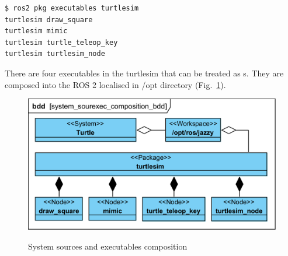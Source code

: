 \documentclass[11pt,oneside,a4paper]{report}
\begin{document}
\begin{lstlisting}[style=terminal]
$ ros2 pkg executables turtlesim
turtlesim draw_square
turtlesim mimic
turtlesim turtle_teleop_key
turtlesim turtlesim_node
\end{lstlisting}

There are four executables in the turtlesim \stPackage{} that can be treated as \stNode{}s. They are composed into the ROS 2 \stWorkspace{} localised in /opt directory (Fig.~\ref{fig:system_sourexec_composition_bdd}).


\begin{figure}[H]
	\centering
	\begin{center}
		{\includegraphics[scale=1.0]{diagrams/system_sourexec_composition_bdd.png}}
	\end{center}
	\caption{System sources and executables composition}
	\label{fig:system_sourexec_composition_bdd}
\end{figure}


			
\AtNextBibliography{\small}
\printbibliography
	
\end{document}
